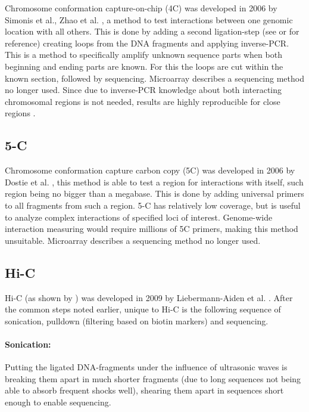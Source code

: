 Chromosome conformation capture-on-chip (4C) was developed in 2006 by Simonis
et al., Zhao et al. \cite{simonis2006nuclear} \cite{zhao2006circular}, a method
to test interactions between one genomic location with all others. This is done
by adding a second ligation-step (see  or 
for reference) creating loops from the DNA fragments and applying inverse-PCR.
This is a method to specifically amplify unknown sequence parts when both
beginning and ending parts are known. For this the loops are cut within the
known section, followed by sequencing. Microarray describes a sequencing
method no longer used. Since due to inverse-PCR knowledge about both
interacting chromosomal regions is not needed, results are highly reproducible
for close regions .



\subsection{5-C}\label{sec:5C}

Chromosome conformation capture carbon copy (5C) was developed in 2006 by
Dostie et al. \cite{dostie2006chromosome}, this method is able to test a region
for interactions with itself, such region being no bigger than a megabase. This
is done by adding universal primers to all fragments from such a region.
5-C has relatively low coverage, but is useful to analyze complex interactions
of specified loci of interest. Genome-wide interaction measuring would require
millions of 5C primers, making this method unsuitable. Microarray describes a
sequencing method no longer used.







\subsection{Hi-C}\label{sec:HiC}

Hi-C (as shown by ) was developed in 2009 by Liebermann-Aiden et al.
\cite{lieberman2009comprehensive}. After the common steps noted earlier, unique
to Hi-C is the following sequence of sonication, pulldown (filtering based on
biotin markers) and sequencing.


\paragraph{Sonication:}\label{sec:sonication}
Putting the ligated DNA-fragments under the influence of ultrasonic waves is
breaking them apart in much shorter fragments (due to long sequences not being
able to absorb frequent shocks well), shearing them apart in sequences short
enough to enable sequencing.


